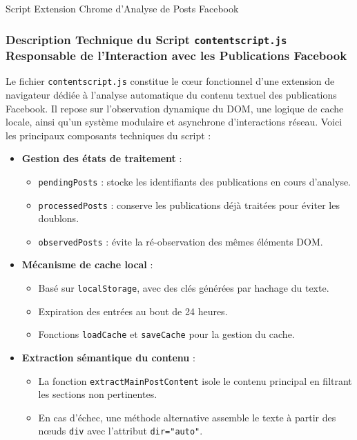 \begin{description}
 \begin{specialpar}
      \item Script Extension Chrome d'Analyse de Posts Facebook
 \end{specialpar}
\end{description} \begin{description}
  
\subsubsection{Description Technique du Script \texttt{contentscript.js} Responsable de l'Interaction avec les Publications Facebook}

Le fichier \texttt{contentscript.js} constitue le cœur fonctionnel d'une extension de navigateur dédiée à l’analyse automatique du contenu textuel des publications Facebook. Il repose sur l’observation dynamique du DOM, une logique de cache locale, ainsi qu’un système modulaire et asynchrone d’interactions réseau. Voici les principaux composants techniques du script :

\begin{itemize}
    \item \textbf{Gestion des états de traitement} :
    \begin{itemize}
        \item \texttt{pendingPosts} : stocke les identifiants des publications en cours d’analyse.
        \item \texttt{processedPosts} : conserve les publications déjà traitées pour éviter les doublons.
        \item \texttt{observedPosts} : évite la ré-observation des mêmes éléments DOM.
    \end{itemize}

    \item \textbf{Mécanisme de cache local} :
    \begin{itemize}
        \item Basé sur \texttt{localStorage}, avec des clés générées par hachage du texte.
        \item Expiration des entrées au bout de 24 heures.
        \item Fonctions \texttt{loadCache} et \texttt{saveCache} pour la gestion du cache.
    \end{itemize}

    \item \textbf{Extraction sémantique du contenu} :
    \begin{itemize}
        \item La fonction \texttt{extractMainPostContent} isole le contenu principal en filtrant les sections non pertinentes.
        \item En cas d’échec, une méthode alternative assemble le texte à partir des nœuds \texttt{div} avec l’attribut \texttt{dir="auto"}.
    \end{itemize}


\end{itemize}
\end{description}
